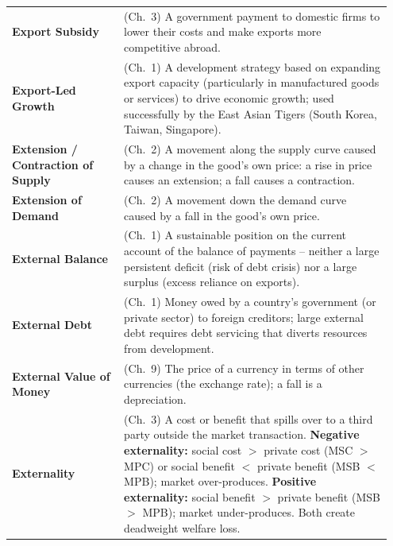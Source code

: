 \documentclass[11pt, a4paper, twoside]{book}
\begin{document}
\begin{longtable}{@{}>{\RaggedRight\arraybackslash}p{0.28\linewidth}>{\RaggedRight\arraybackslash}p{0.67\linewidth}@{}}
\textbf{Export Subsidy} & (Ch.~3) A government payment to domestic firms to lower their costs and make exports more competitive abroad. \\
\textbf{Export-Led Growth} & (Ch.~1) A development strategy based on expanding export capacity (particularly in manufactured goods or services) to drive economic growth; used successfully by the East Asian Tigers (South Korea, Taiwan, Singapore). \\
\textbf{Extension / Contraction of Supply} & (Ch.~2) A movement along the supply curve caused by a change in the good's own price: a rise in price causes an extension; a fall causes a contraction. \\
\textbf{Extension of Demand} & (Ch.~2) A movement down the demand curve caused by a fall in the good's own price. \\
\textbf{External Balance} & (Ch.~1) A sustainable position on the current account of the balance of payments -- neither a large persistent deficit (risk of debt crisis) nor a large surplus (excess reliance on exports). \\
\textbf{External Debt} & (Ch.~1) Money owed by a country's government (or private sector) to foreign creditors; large external debt requires debt servicing that diverts resources from development. \\
\textbf{External Value of Money} & (Ch.~9) The price of a currency in terms of other currencies (the exchange rate); a fall is a depreciation. \\
\textbf{Externality} & (Ch.~3) A cost or benefit that spills over to a third party outside the market transaction. \textbf{Negative externality:} social cost $>$ private cost (MSC $>$ MPC) or social benefit $<$ private benefit (MSB $<$ MPB); market over-produces. \textbf{Positive externality:} social benefit $>$ private benefit (MSB $>$ MPB); market under-produces. Both create deadweight welfare loss. \\


\end{longtable}
\end{document}
